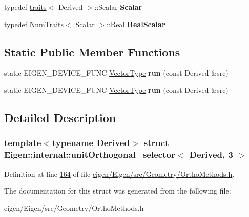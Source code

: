 \begin{DoxyCompactItemize}
\mbox{\label{struct_eigen_1_1internal_1_1unit_orthogonal__selector_3_01_derived_00_013_01_4_a896fc4aa9d01f63b4a82c1bca43c61f9}} 
typedef \hyperlink{struct_eigen_1_1internal_1_1traits}{traits}$<$ Derived $>$\+::Scalar {\bfseries Scalar}
\item 
\mbox{\label{struct_eigen_1_1internal_1_1unit_orthogonal__selector_3_01_derived_00_013_01_4_a148fa71fd19ee3bd07ec2921a8a087c2}} 
typedef \hyperlink{group___core___module_struct_eigen_1_1_num_traits}{Num\+Traits}$<$ Scalar $>$\+::Real {\bfseries Real\+Scalar}
\end{DoxyCompactItemize}
\subsection*{Static Public Member Functions}
\begin{DoxyCompactItemize}
\item 
\mbox{\label{struct_eigen_1_1internal_1_1unit_orthogonal__selector_3_01_derived_00_013_01_4_ae4934414f579b7264887a98c0db3e3f5}} 
static E\+I\+G\+E\+N\+\_\+\+D\+E\+V\+I\+C\+E\+\_\+\+F\+U\+NC \hyperlink{struct_vector_type}{Vector\+Type} {\bfseries run} (const Derived \&src)
\item 
\mbox{\label{struct_eigen_1_1internal_1_1unit_orthogonal__selector_3_01_derived_00_013_01_4_ae4934414f579b7264887a98c0db3e3f5}} 
static E\+I\+G\+E\+N\+\_\+\+D\+E\+V\+I\+C\+E\+\_\+\+F\+U\+NC \hyperlink{struct_vector_type}{Vector\+Type} {\bfseries run} (const Derived \&src)
\end{DoxyCompactItemize}


\subsection{Detailed Description}
\subsubsection*{template$<$typename Derived$>$\newline
struct Eigen\+::internal\+::unit\+Orthogonal\+\_\+selector$<$ Derived, 3 $>$}



Definition at line \hyperlink{eigen_2_eigen_2src_2_geometry_2_ortho_methods_8h_source_l00164}{164} of file \hyperlink{eigen_2_eigen_2src_2_geometry_2_ortho_methods_8h_source}{eigen/\+Eigen/src/\+Geometry/\+Ortho\+Methods.\+h}.



The documentation for this struct was generated from the following file\+:\begin{DoxyCompactItemize}
\item 
eigen/\+Eigen/src/\+Geometry/\+Ortho\+Methods.\+h\end{DoxyCompactItemize}
